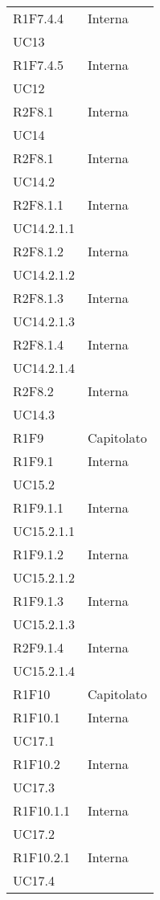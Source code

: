 \begin{longtable}{|C{6.5cm}|C{6.5cm}|}
	R1F7.4.4 &  \centering Interna \\ UC13 \tabularnewline

	R1F7.4.5 & \centering Interna \\ UC12 \tabularnewline

	R2F8.1 & \centering Interna \\ UC14 \tabularnewline

	R2F8.1 & \centering Interna \\ UC14.2 \tabularnewline

	R2F8.1.1 & \centering Interna \\ UC14.2.1.1 \tabularnewline

	R2F8.1.2 & \centering Interna \\ UC14.2.1.2 \tabularnewline

	R2F8.1.3 & \centering Interna \\ UC14.2.1.3 \tabularnewline

	R2F8.1.4 & \centering Interna \\ UC14.2.1.4 \tabularnewline

	R2F8.2 & \centering Interna \\ UC14.3 \tabularnewline

	R1F9 &  Capitolato \\

	R1F9.1 & \centering Interna \\ UC15.2 \tabularnewline

	R1F9.1.1 & \centering Interna \\ UC15.2.1.1 \tabularnewline

	R1F9.1.2 & \centering Interna \\ UC15.2.1.2 \tabularnewline

	R1F9.1.3 & \centering Interna \\ UC15.2.1.3 \tabularnewline

	R2F9.1.4 & \centering Interna \\ UC15.2.1.4 \tabularnewline

	R1F10 & Capitolato \\

	R1F10.1 &  \centering Interna \\ UC17.1 \tabularnewline

	R1F10.2 & \centering Interna \\ UC17.3 \tabularnewline

	R1F10.1.1 &  \centering Interna \\ UC17.2 \tabularnewline

	R1F10.2.1 &  \centering Interna \\ UC17.4 \tabularnewline


\end{longtable}
